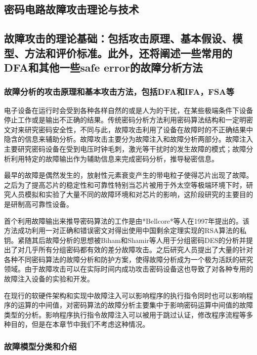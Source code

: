 \documentclass[a4paper,12pt]{article}
\begin{document}
\begin{CJK}{UTF8}{gkai}
\section{密码电路故障攻击理论与技术}
\subsection{故障攻击的理论基础：包括攻击原理、基本假设、模型、方法和评价标准。此外，还将阐述一些常用的DFA和其他一些safe error的故障分析方法}
\subsubsection{故障分析的攻击原理和基本攻击方法，包括DFA和IFA，FSA等}

电子设备在运行时会受到各种各样自然的或是人为的干扰，在某些极端条件下设备停止工作或是输出不正确的结果。传统密码分析方法利用密码算法结构和一定明密文对来研究密码安全性，不同与此，故障攻击利用了设备在故障时的不正确结果中隐含的信息来辅助分析。故障攻击主要分为故障注入和故障分析两部分。故障注入主要研究密码设备在受到电压时钟毛刺，激光等干扰时的发生故障的模式；故障分析利用特定的故障输出作为辅助信息来完成密码分析，推导秘密信息。

最早的故障是偶然发生的，放射性元素衰变产生的带电粒子使得芯片出现了故障。之后为了提高芯片的稳定性和可靠性特别当芯片被用于外太空等极端环境下时，研究人员模拟和实验了大量不同的故障环境和对芯片的影响，这阶段研究的主要目的是研制高可靠性设备。

首个利用故障输出来推导密码算法的工作是由*Bellcore*等人在1997年提出的。该方法成功利用一对正确和错误密文对得出使用中国剩余定理实现的RSA算法的私钥。紧随其后故障分析的思想被Biham和Shamir等人用于分组密码DES的分析并提出了对几乎所有分组密码都有效的差分故障攻击。之后研究人员提出了大量的针对各种不同密码算法的故障分析和防护方案，使得故障分析成为一个极为活跃的研究领域。由于故障攻击可以在实际时间内成功攻击密码设备这也导致了对各种专用的故障注入设备的实验和开发。

在现行的软硬件架构和实现中故障注入可以影响程序的执行指令同时也可以影响程序的运算的中间值，对密码算法的故障分析主要集中于影响密码运算中间值的故障类型的分析。影响程序执行指令故障注入可以被用于跳过认证，修改程序流程等多种目的，但是在本章节中我们不考虑这种情况。

\subsubsection{故障模型分类和介绍}


\end{CJK}
\end{document}
